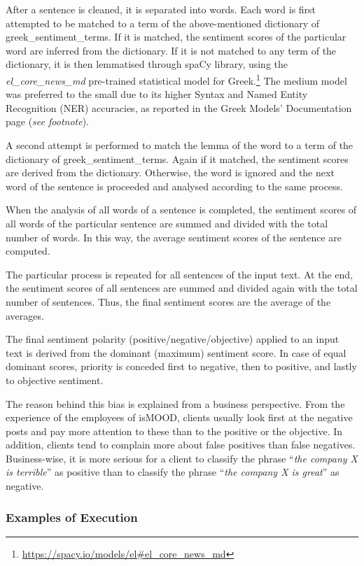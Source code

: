 After a sentence is cleaned, it is separated into words.
Each word is first attempted to be matched
to a term of the above-mentioned dictionary of greek\_sentiment\_terms.
If it is matched,
the sentiment scores of the particular word are inferred from the dictionary.
If it is not matched to any term of the dictionary,
it is then lemmatised through spaCy library,
using the \emph{el\_core\_news\_md} pre-trained statistical model for Greek.\footnote{\url {https://spacy.io/models/el#el_core_news_md}}
The medium model was preferred to the small
due to its higher Syntax and Named Entity Recognition (NER) accuracies,
as reported in the Greek Models' Documentation page (\textit {see footnote}).

A second attempt is performed to match the lemma of the word
to a term of the dictionary of greek\_sentiment\_terms.
Again if it matched,
the sentiment scores are derived from the dictionary.
Otherwise, the word is ignored and the next word of the sentence is proceeded
and analysed according to the same process.

When the analysis of all words of a sentence is completed,
the sentiment scores of all words of the particular sentence
are summed and divided with the total number of words.
In this way,
the average sentiment scores of the sentence are computed.

The particular process is repeated for all sentences of the input text.
At the end,
the sentiment scores of all sentences are summed
and divided again with the total number of sentences.
Thus, the final sentiment scores are the average of the averages.

The final sentiment polarity (positive/negative/objective)
applied to an input text
is derived from the dominant (maximum) sentiment score.
In case of equal dominant scores,
priority is conceded first to negative,
then to positive, and lastly to objective sentiment.

The reason behind this bias is explained
from a business perspective.
From the experience of the employees of isMOOD,
clients usually look first at the negative posts
and pay more attention to these
than to the positive or the objective.
In addition, clients tend to complain more
about false positives than false negatives.
Business-wise, it is more serious for a client
to classify the phrase ``\emph{the company X is terrible}'' as positive
than to classify the phrase ``\emph{the company X is great}'' as negative.

\subsubsection{Examples of Execution}
\label{subsubsec:algexample}


